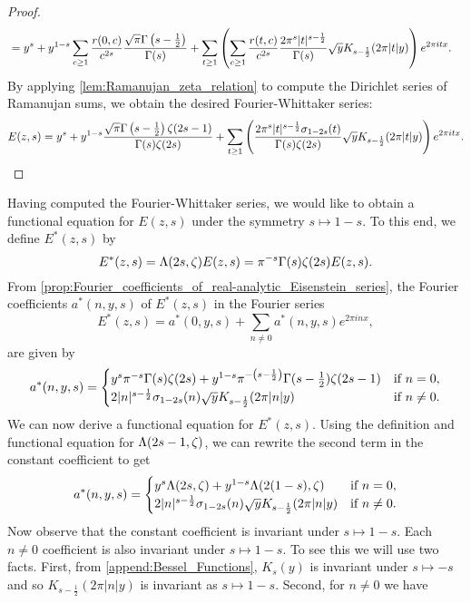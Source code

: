 \begin{proof}
\begin{align*}
        &= y^{s}+y^{1-s}\sum_{c \ge 1}\frac{r(0,c)}{c^{2s}}\frac{\sqrt{\pi}\Gamma\left(s-\frac{1}{2}\right)}{\Gamma(s)}+\sum_{t \ge 1}\left(\sum_{c \ge 1}\frac{r(t,c)}{c^{2s}}\frac{2\pi^{s}|t|^{s-\frac{1}{2}}}{\Gamma(s)}\sqrt{y}K_{s-\frac{1}{2}}(2\pi|t|y)\right)e^{2\pi itx}.
      \end{align*}
      By applying \cref{lem:Ramanujan_zeta_relation} to compute the Dirichlet series of Ramanujan sums, we obtain the desired Fourier-Whittaker series:
      \[
        E(z,s) = y^{s}+y^{1-s}\frac{\sqrt{\pi}\Gamma\left(s-\frac{1}{2}\right)\zeta(2s-1)}{\Gamma(s)\zeta(2s)}+\sum_{t \ge 1}\left(\frac{2\pi^{s}|t|^{s-\frac{1}{2}}\sigma_{1-2s}(t)}{\Gamma(s)\zeta(2s)}\sqrt{y}K_{s-\frac{1}{2}}(2\pi|t|y)\right)e^{2\pi itx}.
      \]
      \end{proof}

      Having computed the Fourier-Whittaker series, we would like to obtain a functional equation for $E(z,s)$ under the symmetry $s \mapsto 1-s$. To this end, we define $E^{\ast}(z,s)$ by
      \[
        E^{\ast}(z,s) = \Lambda(2s,\zeta)E(z,s) = \pi^{-s}\Gamma(s)\zeta(2s)E(z,s).
      \]
      From \cref{prop:Fourier_coefficients_of_real-analytic_Eisenstein_series}, the Fourier coefficients $a^{\ast}(n,y,s)$ of $E^{\ast}(z,s)$ in the Fourier series
      \[
        E^{\ast}(z,s) = a^{\ast}(0,y,s)+\sum_{n \neq 0}a^{\ast}(n,y,s)e^{2\pi inx},
      \]
       are given by
      \[
        a^{\ast}(n,y,s) = \begin{cases} y^{s}\pi^{-s}\Gamma(s)\zeta(2s)+y^{1-s}\pi^{-\left(s-\frac{1}{2}\right)}\Gamma(s-\frac{1}{2})\zeta(2s-1) & \text{if $n = 0$}, \\ 2|n|^{s-\frac{1}{2}}\sigma_{1-2s}(n)\sqrt{y}K_{s-\frac{1}{2}}(2\pi|n|y) & \text{if $n \neq 0$}. \end{cases}
      \]
      We can now derive a functional equation for $E^{\ast}(z,s)$. Using the definition and functional equation for $\Lambda(2s-1,\zeta)$, we can rewrite the second term in the constant coefficient to get
      \begin{equation}\label{equ:Fourier_coefficients_for_completed_real-analytic_Eisenstein_series}
        a^{\ast}(n,y,s) = \begin{cases} y^{s}\Lambda(2s,\zeta)+y^{1-s}\Lambda(2(1-s),\zeta) & \text{if $n = 0$}, \\ 2|n|^{s-\frac{1}{2}}\sigma_{1-2s}(n)\sqrt{y}K_{s-\frac{1}{2}}(2\pi|n|y) & \text{if $n \neq 0$}. \end{cases}
      \end{equation}
      Now observe that the constant coefficient is invariant under $s \mapsto 1-s$. Each $n \neq 0$ coefficient is also invariant under $s \mapsto 1-s$. To see this we will use two facts. First, from \cref{append:Bessel_Functions}, $K_{s}(y)$ is invariant under $s \mapsto -s$ and so $K_{s-\frac{1}{2}}(2\pi|n|y)$ is invariant as $s \mapsto 1-s$. Second, for $n \neq 0$ we have
